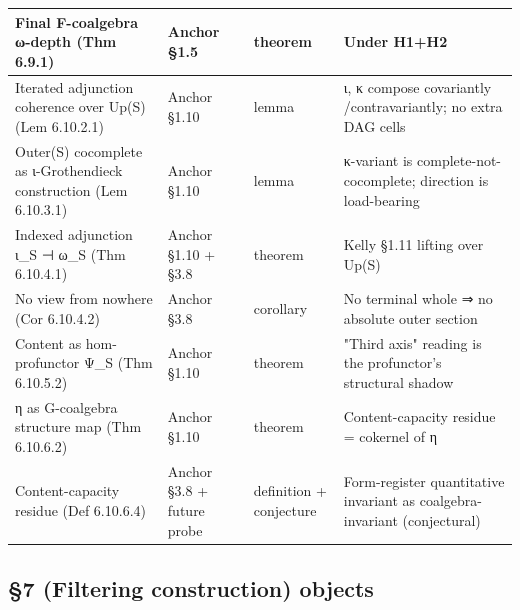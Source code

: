 \documentclass[11pt, openany]{book}
\begin{document}
\begin{longtable}{p{0.52in} p{0.52in} p{0.52in} p{2.73in}}
\midrule
Final F-coalgebra ω-depth (Thm 6.9.1) & Anchor §1.5 & theorem & Under H1+H2 \\
\midrule
Iterated adjunction coherence over Up(S) (Lem 6.10.2.1) & Anchor §1.10 & lemma & ι, κ compose covariantly /\allowbreak  contravariantly; no extra DAG cells \\
\midrule
Outer(S) cocomplete as ι-Grothendieck construction (Lem 6.10.3.1) & Anchor §1.10 & lemma & κ-variant is complete-not-cocomplete; direction is load-bearing \\
\midrule
Indexed adjunction ι\_\allowbreak{}S ⊣ ω\_\allowbreak{}S (Thm 6.10.4.1) & Anchor §1.10 + §3.8 & theorem & Kelly §1.11 lifting over Up(S) \\
\midrule
No view from nowhere (Cor 6.10.4.2) & Anchor §3.8 & corollary & No terminal whole ⇒ no absolute outer section \\
\midrule
Content as hom-profunctor Ψ\_\allowbreak{}S (Thm 6.10.5.2) & Anchor §1.10 & theorem & "Third axis" reading is the profunctor's structural shadow \\
\midrule
η as G-coalgebra structure map (Thm 6.10.6.2) & Anchor §1.10 & theorem & Content-capacity residue = cokernel of η \\
\midrule
Content-capacity residue (Def 6.10.6.4) & Anchor §3.8 + future probe & definition + conjecture & Form-register quantitative invariant as coalgebra-invariant (conjectural) \\
\bottomrule
\end{longtable}
\endgroup
\subsection{§7 (Filtering construction) objects}
\end{document}
